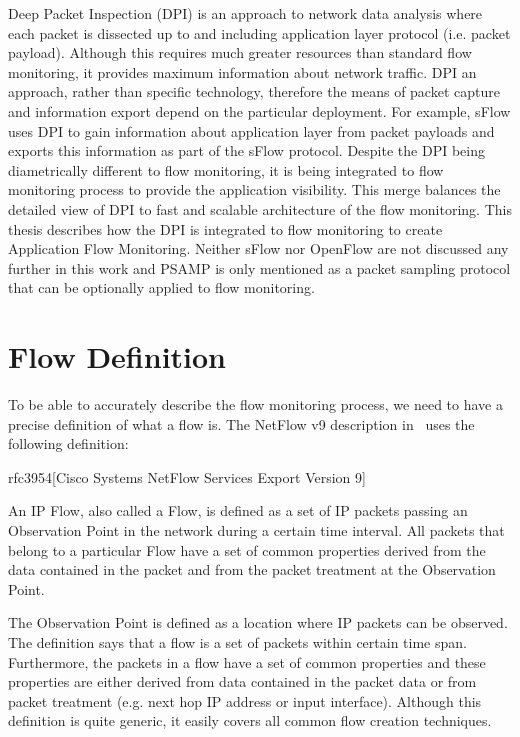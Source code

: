 Deep Packet Inspection (DPI) is an approach to network data analysis where each packet is dissected up to and including application layer protocol (i.e. packet payload). Although this requires much greater resources than standard flow monitoring, it provides maximum information about network traffic. DPI an approach, rather than specific technology, therefore the means of packet capture and information export depend on the particular deployment. For example, sFlow uses DPI to gain information about application layer from packet payloads and exports this information as part of the sFlow protocol. Despite the DPI being diametrically different to flow monitoring, it is being integrated to flow monitoring process to provide the application visibility. This merge balances the detailed view of DPI to fast and scalable architecture of the flow monitoring. This thesis describes how the DPI is integrated to flow monitoring to create Application Flow Monitoring. Neither sFlow nor OpenFlow are not discussed any further in this work and PSAMP is only mentioned as a packet sampling protocol that can be optionally applied to flow monitoring.


\section{Flow Definition}

To be able to accurately describe the flow monitoring process, we need to have a precise definition of what a flow is. The NetFlow v9 description in~\cite{rfc3954} uses the following definition:

\begin{displaycquote}{rfc3954}[Cisco Systems NetFlow Services Export Version 9]

    An IP Flow, also called a Flow, is defined as a set of IP packets
    passing an Observation Point in the network during a certain time
    interval. All packets that belong to a particular Flow have a set of
    common properties derived from the data contained in the packet and
    from the packet treatment at the Observation Point.

\end{displaycquote}

The Observation Point is defined as a location where IP packets can be observed. The definition says that a flow is a set of packets within certain time span. Furthermore, the packets in a flow have a set of common properties and these properties are either derived from data contained in the packet data or from packet treatment (e.g. next hop IP address or input interface). Although this definition is quite generic, it easily covers all common flow creation techniques.

